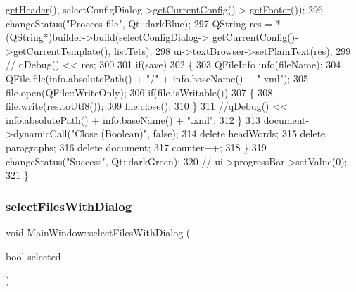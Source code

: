 \begin{DoxyCode}
      \hyperlink{class_parser_config_a336cf3ab9bd7c8bc894dcc2b383d3a7b}{getHeader}(), selectConfigDialog->\hyperlink{class_select_parser_window_ab6397caf6e7270309a5b57befb3f144f}{getCurrentConfig}()->
      \hyperlink{class_parser_config_ac42d4bcd85b1bb65840a5325926b96d4}{getFooter}());
296         changeStatus(\textcolor{stringliteral}{"Procces file"}, Qt::darkBlue);
297         QString res = *(QString*)builder->\hyperlink{class_builder_a92d31ffc3502acebf0cd074e8b084751}{build}(selectConfigDialog->
      \hyperlink{class_select_parser_window_ab6397caf6e7270309a5b57befb3f144f}{getCurrentConfig}()->\hyperlink{class_parser_config_a59e44b4b1bc104b9de240cb7640bb63f}{getCurrentTemplate}(), listTets);
298         ui->textBrowser->setPlainText(res);
299         \textcolor{comment}{// qDebug() << res;}
300 
301         \textcolor{keywordflow}{if}(save)
302         \{
303             QFileInfo info(fileName);
304             QFile file(info.absolutePath() + \textcolor{stringliteral}{"/"} + info.baseName() + \textcolor{stringliteral}{".xml"});
305             file.open(QFile::WriteOnly);
306             \textcolor{keywordflow}{if}(file.isWritable())
307             \{
308                 file.write(res.toUtf8());
309                 file.close();
310             \}
311             \textcolor{comment}{//qDebug() << info.absolutePath() + info.baseName() + ".xml";}
312         \}
313         document->dynamicCall(\textcolor{stringliteral}{"Close (Boolean)"}, \textcolor{keyword}{false});
314         \textcolor{keyword}{delete} headWords;
315         \textcolor{keyword}{delete} paragraphs;
316         \textcolor{keyword}{delete} document;
317         counter++;
318     \}
319     changeStatus(\textcolor{stringliteral}{"Success"}, Qt::darkGreen);
320     \textcolor{comment}{// ui->progressBar->setValue(0);}
321 \}
\end{DoxyCode}
\mbox{\label{class_main_window_ae454fa786ec097491d801d8bc7d3824c}} 
\subsubsection{\texorpdfstring{select\+Files\+With\+Dialog}{selectFilesWithDialog}}
{\footnotesize\ttfamily void Main\+Window\+::select\+Files\+With\+Dialog (\begin{DoxyParamCaption}\item[{bool}]{selected }\end{DoxyParamCaption})\hspace{0.3cm}{\ttfamily [slot]}}

